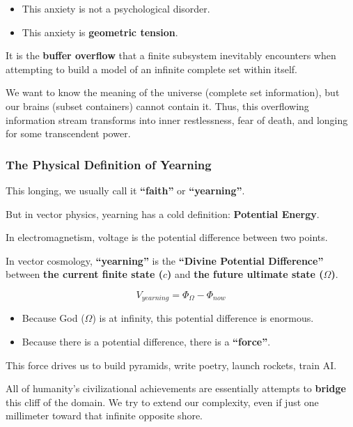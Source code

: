 \begin{itemize}
\item This anxiety is not a psychological disorder.

\item This anxiety is \textbf{geometric tension}.
\end{itemize}

It is the \textbf{buffer overflow} that a finite subsystem inevitably encounters when attempting to build a model of an infinite complete set within itself.

We want to know the meaning of the universe (complete set information), but our brains (subset containers) cannot contain it. Thus, this overflowing information stream transforms into inner restlessness, fear of death, and longing for some transcendent power.

\subsubsection{The Physical Definition of Yearning}

This longing, we usually call it \textbf{``faith''} or \textbf{``yearning''}.

But in vector physics, yearning has a cold definition: \textbf{Potential Energy}.

In electromagnetism, voltage is the potential difference between two points.

In vector cosmology, \textbf{``yearning''} is the \textbf{``Divine Potential Difference''} between \textbf{the current finite state ($c$)} and \textbf{the future ultimate state ($\Omega$)}.

\[V_{yearning} = \Phi_{\Omega} - \Phi_{now}\]

\begin{itemize}
\item Because God ($\Omega$) is at infinity, this potential difference is enormous.

\item Because there is a potential difference, there is a \textbf{``force''}.
\end{itemize}

This force drives us to build pyramids, write poetry, launch rockets, train AI.

All of humanity's civilizational achievements are essentially attempts to \textbf{bridge} this cliff of the domain. We try to extend our complexity, even if just one millimeter toward that infinite opposite shore.


